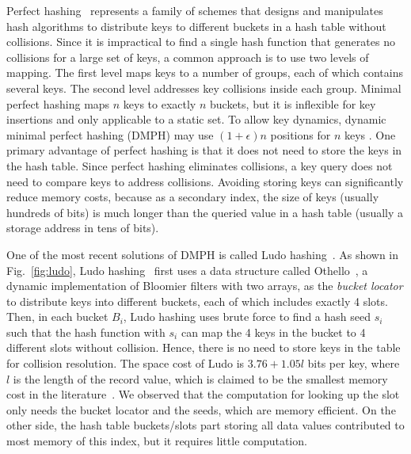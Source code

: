 Perfect hashing~\cite{praticalph} represents a family of schemes that designs and manipulates hash algorithms to distribute keys to different buckets in a hash table without collisions.
Since it is impractical to find a single hash function that generates no collisions for a large set of keys, a common approach is to use two levels of mapping. The first level maps keys to a number of groups, each of which contains several keys. The second level addresses key collisions inside each group. Minimal perfect hashing maps $n$ keys to exactly $n$ buckets, but it is inflexible for key insertions and only applicable to a static set. To allow key dynamics, dynamic minimal perfect hashing (DMPH) may use $(1+\epsilon)n$ positions for $n$ keys \cite{scalebricks,ludo}. 
One primary advantage of perfect hashing is that it does not need to store the keys in the hash table. Since perfect hashing eliminates collisions, a key query does not need to compare keys to address collisions. Avoiding storing keys can significantly reduce memory costs, because as a secondary index, the size of keys (usually hundreds of bits) is much longer than the queried value in a hash table (usually a storage address in tens of bits). 


One of the most recent solutions of DMPH is called Ludo hashing~\cite{ludo}. 
As shown in Fig.~\ref{fig:ludo}, Ludo hashing~\cite{ludo} first uses a data structure called Othello~\cite{othello}, a dynamic implementation of Bloomier filters \cite{bloomier} with two arrays, as the \textit{bucket locator} to distribute keys into different buckets, each of which includes exactly 4 slots. Then, in each bucket $B_i$, Ludo hashing uses brute force to find a hash seed $s_i$ such that the hash function with $s_i$
can map the 4 keys in the bucket to 4 different slots without collision. Hence, there is no need to store keys in the table for collision resolution. 
The space cost of Ludo is $3.76 + 1.05l$ bits per key, where $l$ is the length of the record value, which is claimed to be the smallest memory cost in the literature~\cite{ludo}. 
We observed that the computation for looking up the slot only needs the bucket locator and the seeds, which are memory efficient. On the other side, the hash table buckets/slots part storing all data values contributed to most memory of this index, but it requires little computation.


